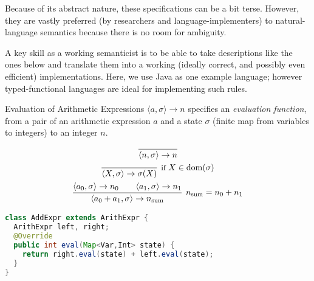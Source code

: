 Because of its abstract nature, these specifications can be a bit terse.
However, they are vastly preferred (by researchers and language-implementers)
to natural-language semantics because there is no room for ambiguity.

A key skill as a working semanticist is to be able to take descriptions like
the ones below and translate them into a working (ideally correct, and possibly
even efficient) implementations. Here, we use Java as one example language;
however typed-functional languages are ideal for implementing such rules.

\begin{frame}[fragile]{Evaluation of Arithmetic Expressions}
    $\langle a, \sigma \rangle \rightarrow n$ specifies an \emph{evaluation
    function}, from a pair of an arithmetic expression $a$ and a state
    $\sigma$ (finite map from variables to integers) to an integer $n$.
    \begin{overprint}
        \begin{gather*}
            \infer{\langle n , \sigma \rangle \rightarrow n}{} \\
            \infer[\text{\small if } X \in \mathrm{dom}(\sigma)]{\langle X , \sigma \rangle \rightarrow \sigma(X)}{} \\
            \infer[n_\mathrm{sum} = n_0 + n_1]{\langle a_0 + a_1 , \sigma \rangle \rightarrow n_\mathrm{sum}}{\langle a_0 , \sigma \rangle \rightarrow n_0 \qquad \langle a_1 , \sigma \rangle \rightarrow n_1}
        \end{gather*}
        \begin{alertenv}
        \begin{itemize}
        \end{itemize}
        \end{alertenv}
        \begin{lstlisting}[language=java, basicstyle=\small]
class AddExpr extends ArithExpr {
  ArithExpr left, right;
  @Override
  public int eval(Map<Var,Int> state) {
    return right.eval(state) + left.eval(state);
  }
}
        \end{lstlisting}
    \end{overprint}
\end{frame}

